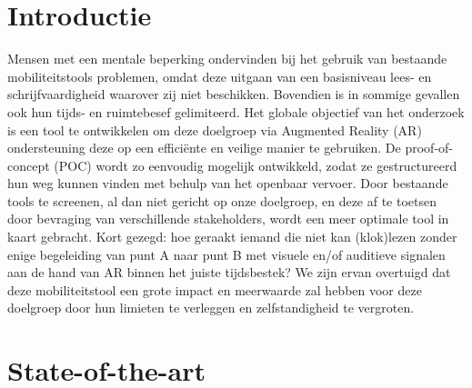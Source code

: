 

\section{Introductie}%
\label{sec:introductie}

    Mensen met een mentale beperking ondervinden bij het gebruik van bestaande mobiliteitstools problemen, omdat deze uitgaan van een basisniveau lees- en schrijfvaardigheid waarover zij niet beschikken. 
    Bovendien is in sommige gevallen ook hun tijds- en ruimtebesef gelimiteerd. 
    Het globale objectief van het onderzoek is een tool te ontwikkelen om deze doelgroep via Augmented Reality (AR) ondersteuning deze op een efficiënte en veilige manier te gebruiken. 
    De proof-of-concept (POC) wordt zo eenvoudig mogelijk ontwikkeld, zodat ze gestructureerd hun weg kunnen vinden met behulp van het openbaar vervoer. 
    Door bestaande tools te screenen, al dan niet gericht op onze doelgroep, en deze af te toetsen door bevraging van verschillende stakeholders, wordt een meer optimale tool in kaart gebracht. 
    Kort gezegd: hoe geraakt iemand die niet kan (klok)lezen zonder enige begeleiding van punt A naar punt B met visuele en/of auditieve signalen aan de hand van AR binnen het juiste tijdsbestek?
    We zijn ervan overtuigd dat deze mobiliteitstool een grote impact en meerwaarde zal hebben voor deze doelgroep door hun limieten te verleggen en zelfstandigheid te vergroten.


\section{State-of-the-art}%
\label{sec:state-of-the-art}

